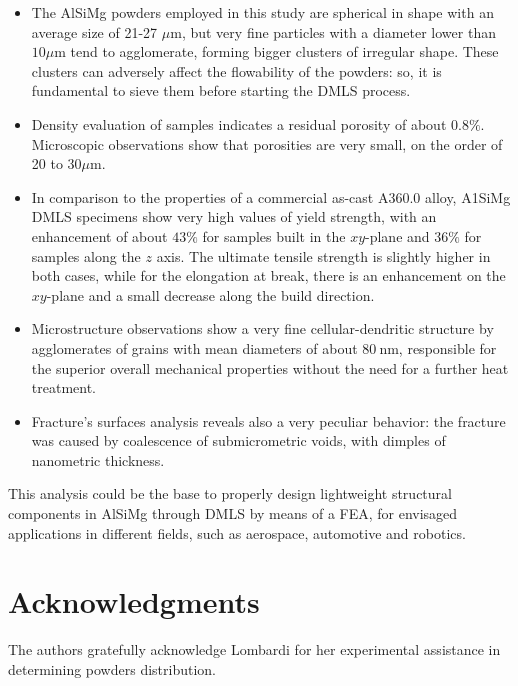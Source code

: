 \documentclass[10pt]{article}
\begin{document}
\begin{itemize}
  \item The AlSiMg powders employed in this study are spherical in shape with an average size of 21-27 $\mu \mathrm{m}$, but very fine particles with a diameter lower than $10 \mu \mathrm{m}$ tend to agglomerate, forming bigger clusters of irregular shape. These clusters can adversely affect the flowability of the powders: so, it is fundamental to sieve them before starting the DMLS process.
  \item Density evaluation of samples indicates a residual porosity of about $0.8 \%$. Microscopic observations show that porosities are very small, on the order of 20 to $30 \mu \mathrm{m}$.
  \item In comparison to the properties of a commercial as-cast A360.0 alloy, A1SiMg DMLS specimens show very high values of yield strength, with an enhancement of about $43 \%$ for samples built in the $x y$-plane and $36 \%$ for samples along the $z$ axis. The ultimate tensile strength is slightly higher in both cases, while for the elongation at break, there is an enhancement on the $x y$-plane and a small decrease along the build direction.
  \item Microstructure observations show a very fine cellular-dendritic structure by agglomerates of grains with mean diameters of about $80 \mathrm{~nm}$, responsible for the superior overall mechanical properties without the need for a further heat treatment.
  \item Fracture's surfaces analysis reveals also a very peculiar behavior: the fracture was caused by coalescence of submicrometric voids, with dimples of nanometric thickness.
\end{itemize}

This analysis could be the base to properly design lightweight structural components in AlSiMg through DMLS by means of a FEA, for envisaged applications in different fields, such as aerospace, automotive and robotics.

\section*{Acknowledgments}
The authors gratefully acknowledge Lombardi for her experimental assistance in determining powders distribution.
\end{document}
